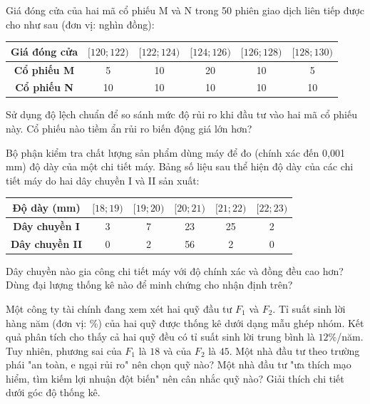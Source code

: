 \documentclass[12pt]{article}
\begin{document}
	\begin{btvang}[title={Bài 3}]
		Giá đóng cửa của hai mã cổ phiếu M và N trong 50 phiên giao dịch liên tiếp được cho như sau (đơn vị: nghìn đồng):
		\begin{center}
			\renewcommand{\arraystretch}{1.3}
			\begin{tabular}{|c|c|c|c|c|c|}
				\hline
				\textbf{Giá đóng cửa} & $[120; 122)$ & $[122; 124)$ & $[124; 126)$ & $[126; 128)$ & $[128; 130)$ \\
				\hline
				\textbf{Cổ phiếu M} & 5 & 10 & 20 & 10 & 5 \\
				\hline
				\textbf{Cổ phiếu N} & 10 & 10 & 10 & 10 & 10 \\
				\hline
			\end{tabular}
		\end{center}
		Sử dụng độ lệch chuẩn để so sánh mức độ rủi ro khi đầu tư vào hai mã cổ phiếu này. Cổ phiếu nào tiềm ẩn rủi ro biến động giá lớn hơn?
	\end{btvang}
	
	\begin{btvang}[title={Bài 4}]
		Bộ phận kiểm tra chất lượng sản phẩm dùng máy để đo (chính xác đến 0,001 mm) độ dày của một chi tiết máy. Bảng số liệu sau thể hiện độ dày của các chi tiết máy do hai dây chuyền I và II sản xuất:
		\begin{center}
			\renewcommand{\arraystretch}{1.3}
			\begin{tabular}{|c|c|c|c|c|c|}
				\hline
				\textbf{Độ dày (mm)} & $[18; 19)$ & $[19; 20)$ & $[20; 21)$ & $[21; 22)$ & $[22; 23)$ \\
				\hline
				\textbf{Dây chuyền I} & 3 & 7 & 23 & 25 & 2 \\
				\hline
				\textbf{Dây chuyền II} & 0 & 2 & 56 & 2 & 0 \\
				\hline
			\end{tabular}
		\end{center}
		Dây chuyền nào gia công chi tiết máy với độ chính xác và đồng đều cao hơn? Dùng đại lượng thống kê nào để minh chứng cho nhận định trên?
	\end{btvang}
	
	\begin{btdo}[title={Bài 5}]
		Một công ty tài chính đang xem xét hai quỹ đầu tư $F_1$ và $F_2$. Tỉ suất sinh lời hàng năm (đơn vị: \%) của hai quỹ được thống kê dưới dạng mẫu ghép nhóm. Kết quả phân tích cho thấy cả hai quỹ đều có tỉ suất sinh lời trung bình là $12\%$/năm. Tuy nhiên, phương sai của $F_1$ là $18$ và của $F_2$ là $45$. 
		Một nhà đầu tư theo trường phái "an toàn, e ngại rủi ro" nên chọn quỹ nào? Một nhà đầu tư "ưa thích mạo hiểm, tìm kiếm lợi nhuận đột biến" nên cân nhắc quỹ nào? Giải thích chi tiết dưới góc độ thống kê.
	\end{btdo}
	
\end{document}
